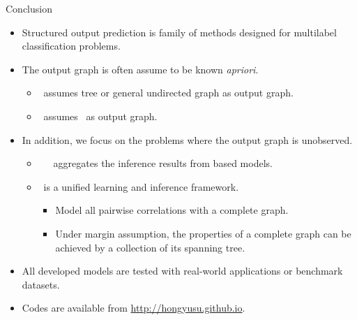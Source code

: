 \documentclass[first=dgreen,second=purple,logo=yellowexc]{aaltoslides}
\begin{document}
%
\begin{frame}{Conclusion}
	\begin{itemize}\footnotesize
		\item Structured output prediction is family of methods designed for multilabel classification problems.
		\item The output graph is often assume to be known {\em apriori}.
		\begin{itemize}\footnotesize
			\item \mmcrf\ assumes tree or general undirected graph as output graph.
			\item \spin\ assumes \daggraph\ as output graph.
		\end{itemize}
		\item In addition, we focus on the problems where the output graph is unobserved.
		\begin{itemize}\footnotesize
			\item \mve\, \amm\, \mam\ aggregates the inference results from based models.
			\item \rta\ is a unified learning and inference framework.
			\begin{itemize}\scriptsize
				\item Model all pairwise correlations with a complete graph.
				\item Under margin assumption, the properties of a complete graph can be achieved by a collection of its spanning tree.
			\end{itemize} 
		\end{itemize}
		\item All developed models are tested with real-world applications or benchmark datasets.
		\item Codes are available from \href{http://hongyusu.github.io}{http://hongyusu.github.io}.
	\end{itemize}
\end{frame}
\end{document}
